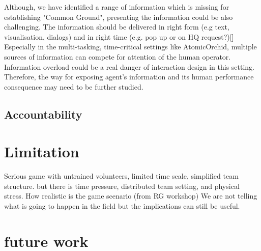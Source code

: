 Although, we have identified a range of information which is missing for establishing "Common Ground", presenting the information could be also challenging. The information should be delivered in right form (e.g text, visualisation, dialogs) and in right time (e.g. pop up or on HQ request?)[] Especially in the multi-tasking, time-critical settings like AtomicOrchid, multiple sources of information can compete for attention of the human operator. Information overload could be a real danger of interaction design in this setting. Therefore, the  way for exposing agent's information and its human performance consequence may need to be further studied.   \\


\subsection{Accountability}\label{sec:conclusionAC}

\section{Limitation}

Serious game with untrained volunteers, limited time scale, simplified team structure.
but there is time pressure, distributed team setting, and physical stress.
How realistic is the game scenario (from RG workshop)
We are not telling what is going to happen in the field but the implications can still be useful.

\section{future work}

